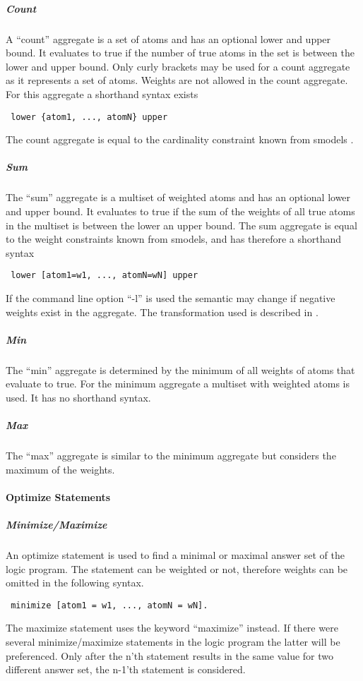 \documentclass[a4paper,10pt]{article}
\begin{document}
\subparagraph{Count}
A ``count'' aggregate is a set of atoms and has an optional lower and upper bound.
It evaluates to true if the number of true atoms in the set is between the lower and upper bound. Only curly brackets may be used for a count aggregate as it represents a set of atoms.
Weights are not allowed in the count aggregate.
For this aggregate a shorthand syntax exists
\begin{verbatim}
 lower {atom1, ..., atomN} upper
\end{verbatim}
The count aggregate is equal to the cardinality constraint known from smodels \cite{smodels}.
\subparagraph{Sum}
The ``sum'' aggregate is a multiset of weighted atoms and has an optional lower and upper bound. It evaluates to true if the sum of the weights of all true atoms in the multiset is between the lower an upper bound.
The sum aggregate is equal to the weight constraints known from smodels, and has therefore a shorthand syntax
\begin{verbatim}
 lower [atom1=w1, ..., atomN=wN] upper
\end{verbatim}
If the command line option ``-l'' is used the semantic may change if negative weights exist in the aggregate. The transformation used is described in \cite{lparseManual}.

\subparagraph{Min}
The ``min'' aggregate is determined by the minimum of all weights of atoms that evaluate to true.
For the minimum aggregate a multiset with weighted atoms is used. It has no shorthand syntax.
\subparagraph{Max}
The ``max'' aggregate is similar to the minimum aggregate but considers the maximum of the weights.

\paragraph{Optimize Statements}

\subparagraph{Minimize/Maximize}
An optimize statement is used to find a minimal or maximal answer set of the logic program.
The statement can be weighted or not, therefore weights can be omitted in the following syntax.
\begin{verbatim}
 minimize [atom1 = w1, ..., atomN = wN].
\end{verbatim}
The maximize statement uses the keyword ``maximize'' instead.
If there were several minimize/maximize statements in the logic program the latter will be preferenced.
Only after the n'th statement results in the same value for two different answer set, the n-1'th statement is considered.
\end{document}
